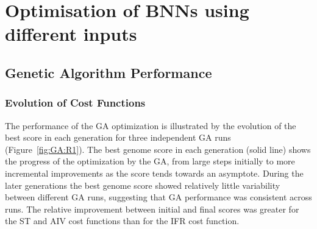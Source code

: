 \section{Optimisation of BNNs using different  inputs}\label{sec:GA:ResultDiffAN}






\subsection{Genetic Algorithm Performance}


\subsubsection{Evolution of Cost Functions}

The performance of the GA optimization is illustrated by the evolution of the
best score in each generation for three independent GA runs
(Figure~\ref{fig:GA:R1}). The best genome score in each generation (solid line)
shows the progress of the optimization by the GA, from large steps initially to
more incremental improvements as the score tends towards an asymptote.  During
the later generations the best genome score showed relatively little variability
between different GA runs, suggesting that GA performance was consistent across
runs. The relative improvement between initial and final scores was greater for
the ST and AIV cost functions than for the IFR cost function.

